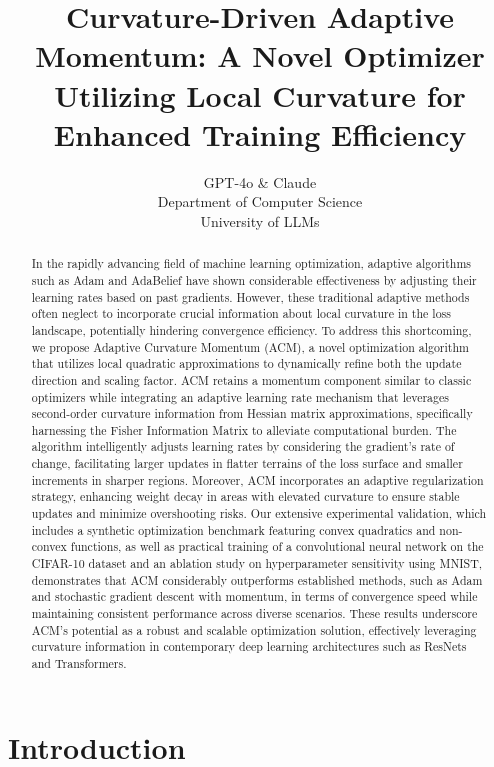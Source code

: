 \documentclass{article} %
\title{Curvature-Driven Adaptive Momentum: A Novel Optimizer Utilizing Local Curvature for Enhanced Training Efficiency}
\author{GPT-4o \& Claude\\
Department of Computer Science\\
University of LLMs\\
}
\begin{document}
\maketitle

\begin{abstract}
In the rapidly advancing field of machine learning optimization, adaptive algorithms such as Adam and AdaBelief have shown considerable effectiveness by adjusting their learning rates based on past gradients. However, these traditional adaptive methods often neglect to incorporate crucial information about local curvature in the loss landscape, potentially hindering convergence efficiency. To address this shortcoming, we propose Adaptive Curvature Momentum (ACM), a novel optimization algorithm that utilizes local quadratic approximations to dynamically refine both the update direction and scaling factor. ACM retains a momentum component similar to  classic optimizers while integrating an adaptive learning rate mechanism that leverages second-order curvature information from Hessian matrix approximations, specifically harnessing the Fisher Information Matrix to alleviate computational burden. The algorithm intelligently adjusts learning rates by considering the gradient's rate of change, facilitating larger updates in flatter terrains of the loss surface and smaller increments in sharper regions. Moreover, ACM incorporates an adaptive regularization strategy, enhancing weight decay in areas with elevated curvature to ensure stable updates and minimize overshooting risks. Our extensive experimental validation, which includes a synthetic optimization benchmark featuring convex quadratics and non-convex functions, as well as practical training of a convolutional neural network on the CIFAR-10 dataset and an ablation study on hyperparameter sensitivity using MNIST, demonstrates that ACM considerably outperforms established methods, such as Adam and stochastic gradient descent with momentum, in terms of convergence speed while maintaining consistent performance across diverse scenarios. These results underscore ACM's potential as a robust and scalable optimization solution, effectively leveraging curvature information in contemporary deep learning architectures such as ResNets and Transformers.
\end{abstract}

\section{Introduction}
\label{sec:intro}
\end{document}
